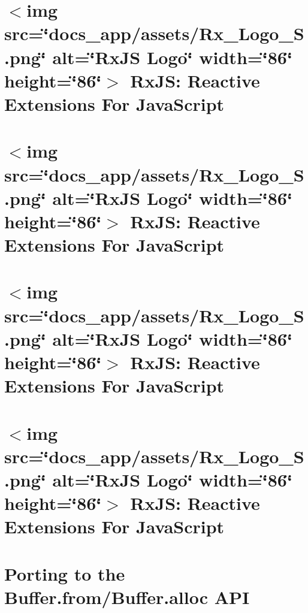 \let\mypdfximage\pdfximage\def\pdfximage{\immediate\mypdfximage}\documentclass[twoside]{book}
\newcommand{\+}{\discretionary{\mbox{\scriptsize$\hookleftarrow$}}{}{}}
\begin{document}
\chapter{$<$img src=\char`\"{}docs\+\_\+app/assets/\+Rx\+\_\+\+Logo\+\_\+\+S.\+png\char`\"{} alt=\char`\"{}\+Rx\+J\+S Logo\char`\"{} width=\char`\"{}86\char`\"{} height=\char`\"{}86\char`\"{}$>$ Rx\+JS\+: Reactive Extensions For Java\+Script}
\label{md_heap-visualizer_node_modules_rxjs__esm2015__r_e_a_d_m_e}

\chapter{$<$img src=\char`\"{}docs\+\_\+app/assets/\+Rx\+\_\+\+Logo\+\_\+\+S.\+png\char`\"{} alt=\char`\"{}\+Rx\+J\+S Logo\char`\"{} width=\char`\"{}86\char`\"{} height=\char`\"{}86\char`\"{}$>$ Rx\+JS\+: Reactive Extensions For Java\+Script}
\label{md_heap-visualizer_node_modules_rxjs__esm5__r_e_a_d_m_e}

\chapter{$<$img src=\char`\"{}docs\+\_\+app/assets/\+Rx\+\_\+\+Logo\+\_\+\+S.\+png\char`\"{} alt=\char`\"{}\+Rx\+J\+S Logo\char`\"{} width=\char`\"{}86\char`\"{} height=\char`\"{}86\char`\"{}$>$ Rx\+JS\+: Reactive Extensions For Java\+Script}
\label{md_heap-visualizer_node_modules_rxjs__r_e_a_d_m_e}

\chapter{$<$img src=\char`\"{}docs\+\_\+app/assets/\+Rx\+\_\+\+Logo\+\_\+\+S.\+png\char`\"{} alt=\char`\"{}\+Rx\+J\+S Logo\char`\"{} width=\char`\"{}86\char`\"{} height=\char`\"{}86\char`\"{}$>$ Rx\+JS\+: Reactive Extensions For Java\+Script}
\label{md_heap-visualizer_node_modules_rxjs_src__r_e_a_d_m_e}

\chapter{Porting to the Buffer.\+from/\+Buffer.alloc A\+PI}
\label{md_heap-visualizer_node_modules_safer-buffer__porting-_buffer}

\end{document}
